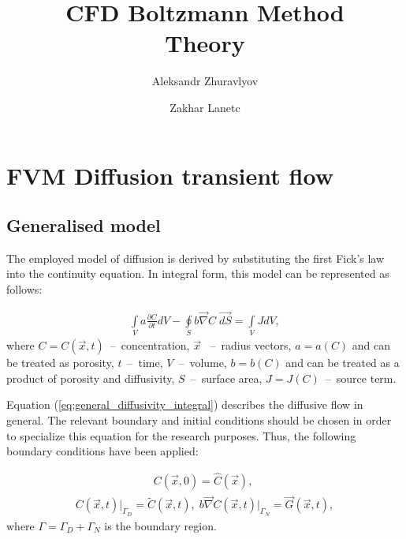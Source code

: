 \documentclass[a4paper,14pt,english]{extreport}
\author{Aleksandr Zhuravlyov \and Zakhar Lanetc}
\title{CFD Boltzmann Method\\Theory}
\date{\DTMnow}
\begin{document}
    \pagecolor{pageColor}
     \color{fontColor}

    \section*{FVM Diffusion transient flow}
    \subsection*{Generalised model}
    
The employed model of diffusion is derived by substituting the first Fick's law into the continuity equation. In integral form, this model can be represented as follows:

    \begin{eqnarray}
        \label{eq:general_diffusivity_integral}
        \int \limits_{V} a \frac{\partial C}{\partial t} d V - \oint \limits_{S} b \vec{\nabla}C \; \vec{dS} = \int \limits_{V} JdV,
    \end{eqnarray}
    where $C = C\left(\vec{x}, t\right)$~--~concentration, $\vec{x}$ ~--~radius vectors, $a = a\left(C\right)$ and can be treated as porosity, $t$~--~time, $V$~--~volume, $b = b\left(C\right)$ and can be treated as a product of porosity and diffusivity, $S$~--~surface area, $J=J\left(C\right)$~--~source term.
    
Equation (\ref{eq:general_diffusivity_integral}) describes the diffusive flow in general. The relevant boundary and initial conditions should be chosen in order to specialize this equation for the research purposes. Thus, the following boundary conditions have been applied:
    
    \begin{eqnarray}
        \label{eq:general_diffusivity_init}
        C\left(\vec{x}, \mathit{0}\right) = \hat{C}\left(\vec{x}\right), \; 
     \end{eqnarray}
    \begin{eqnarray}
      \label{eq:general_diffusivity_bound}
       C\left(\vec{x}, t\right)\Big|_{\mathit{\Gamma}_D} \!\!= \tilde{C}\left(\vec{x}, t\right), \; b \vec{\nabla}C \left(\vec{x}, t\right)\Big|_{\mathit{\Gamma}_N} \!\!= \vec{G}\left(\vec{x}, t\right),
    \end{eqnarray}
where $\mathit{\Gamma} = \mathit{\Gamma_D} + \mathit{\Gamma_N}$ is the boundary region.
\end{document}
